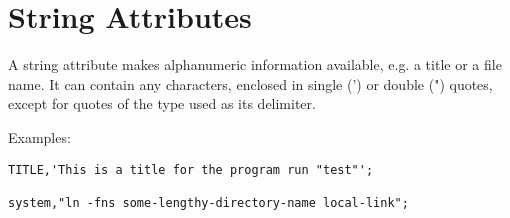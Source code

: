 
\section{String Attributes}

A string attribute makes alphanumeric information available, e.g. a
title or a file name. It can contain any characters, enclosed in single
(') or double (") quotes, except for quotes of the type used as its
delimiter.  

Examples: 
\begin{verbatim}
TITLE,'This is a title for the program run "test"';

system,"ln -fns some-lengthy-directory-name local-link";
\end{verbatim}


